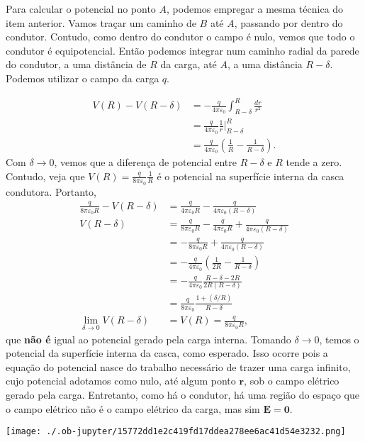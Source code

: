 \documentclass[11pt]{article}
\begin{document}
Para calcular o potencial no ponto \(A\), podemos empregar a mesma técnica
do item anterior. Vamos traçar um caminho de \(B\) até \(A\), passando por
dentro do condutor. Contudo, como dentro do condutor o campo é nulo,
vemos que todo o condutor é equipotencial. Então podemos integrar num
caminho radial da parede do condutor, a uma distância de \(R\) da carga,
até \(A\), a uma distância \(R-\delta\). Podemos utilizar o campo da carga \(q\).

\begin{align}
  V(R) - V(R-\delta) &= -\frac q{4\pi\varepsilon_0}\int_{R-\delta}^R \frac{dr}{r^2}\\
                &= \frac q{4\pi\varepsilon_0}\frac1r\Big\vert_{R-\delta}^R\\
                &= \frac q{4\pi\varepsilon_0}\left(\frac1R-\frac1{R-\delta}\right).
\end{align}
Com \(\delta\rightarrow0\), vemos que a diferença de potencial entre \(R-\delta\) e \(R\) tende a
zero. Contudo, veja que \(V(R)=\frac q{8\pi\varepsilon_0}\frac1R\) é o potencial na
superfície interna da casca condutora. Portanto, 
\begin{align}
  \frac q{8\pi\varepsilon_0R} - V(R-\delta)
  &= \frac q{4\pi\varepsilon_0R} - \frac q{4\pi\varepsilon_0(R-\delta)}\\
  V(R-\delta)
  &= \frac q{8\pi\varepsilon_0R} - \frac q{4\pi\varepsilon_0R} + \frac q{4\pi\varepsilon_0(R-\delta)}\\
  &= -\frac q{8\pi\varepsilon_0R} + \frac q{4\pi\varepsilon_0(R-\delta)}\\
  &= -\frac q{4\pi\varepsilon_0}\left(\frac1{2R}-\frac1{R-\delta}\right)\\
  &=-\frac q{4\pi\varepsilon_0}\frac{R-\delta-2R}{2R(R-\delta)}\\
  &=\frac q{8\pi\varepsilon_0}\frac{1+(\delta/R)}{R-\delta}\\
  \lim_{\delta\rightarrow0}V(R-\delta) &= V(R) = \frac q{8\pi\varepsilon_0R},
\end{align}
que \textbf{não é} igual ao potencial gerado pela carga interna. Tomando \(\delta\rightarrow0\),
temos o potencial da superfície interna da casca, como esperado. Isso ocorre
pois a equação do potencial nasce do trabalho necessário de trazer uma
carga infinito, cujo potencial adotamos como nulo, até algum ponto
\(\mathbf r\), sob o campo elétrico gerado pela carga. Entretanto, como há
o condutor, há uma região do espaço que o campo elétrico não é o campo
elétrico da carga, mas sim \(\mathbf E=\mathbf 0\).

\label{orgb27e443}
\begin{center}
\texttt{[image: ./.ob-jupyter/15772dd1e2c419fd17ddea278ee6ac41d54e3232.png]}
\end{center}
\end{document}
